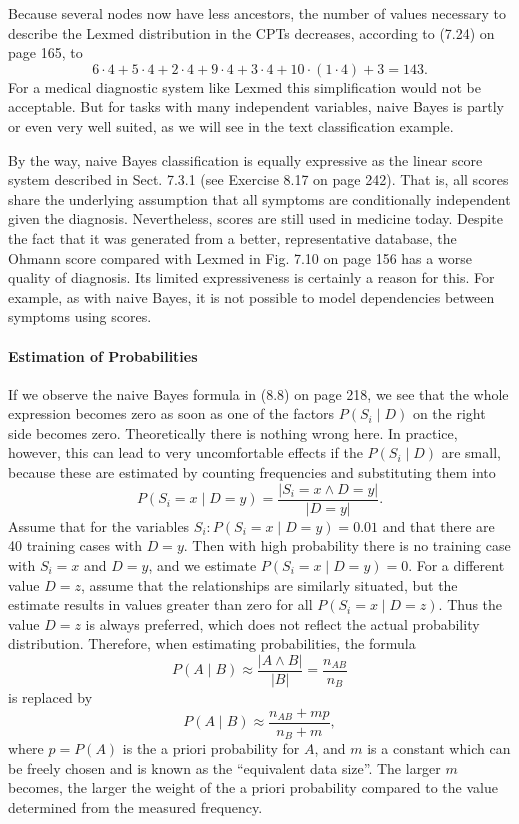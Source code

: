 \documentclass[10pt]{book}
\begin{document}
Because several nodes now have less ancestors, the number of values necessary to describe the Lexmed distribution in the CPTs decreases, according to (7.24) on page 165, to
$$
6 \cdot 4+5 \cdot 4+2 \cdot 4+9 \cdot 4+3 \cdot 4+10 \cdot(1 \cdot 4)+3=143 .
$$
For a medical diagnostic system like Lexmed this simplification would not be acceptable. But for tasks with many independent variables, naive Bayes is partly or even very well suited, as we will see in the text classification example.

By the way, naive Bayes classification is equally expressive as the linear score system described in Sect. 7.3.1 (see Exercise 8.17 on page 242). That is, all scores share the underlying assumption that all symptoms are conditionally independent given the diagnosis. Nevertheless, scores are still used in medicine today. Despite the fact that it was generated from a better, representative database, the Ohmann score compared with Lexmed in Fig. 7.10 on page 156 has a worse quality of diagnosis. Its limited expressiveness is certainly a reason for this. For example, as with naive Bayes, it is not possible to model dependencies between symptoms using scores.

\paragraph{Estimation of Probabilities}
If we observe the naive Bayes formula in (8.8) on page 218, we see that the whole expression becomes zero as soon as one of the factors $P\left(S_{i} \mid D\right)$ on the right side becomes zero. Theoretically there is nothing wrong here. In practice, however, this can lead to very uncomfortable effects if the $P\left(S_{i} \mid D\right)$ are small, because these are estimated by counting frequencies and substituting them into
$$
P\left(S_{i}=x \mid D=y\right)=\frac{\left|S_{i}=x \wedge D=y\right|}{|D=y|} .
$$
Assume that for the variables $S_{i}: P\left(S_{i}=x \mid D=y\right)=0.01$ and that there are 40 training cases with $D=y$. Then with high probability there is no training case with $S_{i}=x$ and $D=y$, and we estimate $P\left(S_{i}=x \mid D=y\right)=0$. For a different value $D=z$, assume that the relationships are similarly situated, but the estimate results in values greater than zero for all $P\left(S_{i}=x \mid D=z\right)$. Thus the value $D=z$ is always preferred, which does not reflect the actual probability distribution. Therefore, when estimating probabilities, the formula
$$
P(A \mid B) \approx \frac{|A \wedge B|}{|B|}=\frac{n_{AB}}{n_{B}}
$$
is replaced by
$$
P(A \mid B) \approx \frac{n_{AB}+m p}{n_{B}+m},
$$
where $p=P(A)$ is the a priori probability for $A$, and $m$ is a constant which can be freely chosen and is known as the ``equivalent data size''. The larger $m$ becomes, the larger the weight of the a priori probability compared to the value determined from the measured frequency.
\end{document}
